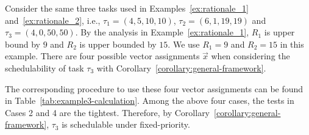  \begin{example}
 \label{ex:general_framework}
  Consider the same three tasks used in Examples~\ref{ex:rationale_1} and~\ref{ex:rationale_2}, i.e., $\tau_1 = (4, 5, 10, 10)$, $\tau_2 =(6, 1, 19, 19)$ and $\tau_3 = (4, 0, 50, 50)$. By the analysis in Example~\ref{ex:rationale_1}, $R_1$ is upper bound by $9$ and $R_2$ is upper bounded by $15$. We use $R_1=9$ and $R_2=15$ in this example. There are four possible vector assignments $\vec{x}$ when considering the schedulability of task $\tau_3$ with Corollary~\ref{corollary:general-framework}.


 


       



The corresponding procedure to use these four vector assignments can be found in Table~\ref{tab:example3-calculation}. 
Among the above four cases, the tests in Cases 2 and 4 are the tightest. Therefore, by
 Corollary~\ref{corollary:general-framework}, $\tau_3$ is
 schedulable under fixed-priority.
\hfill\myendproof
 \end{example}

